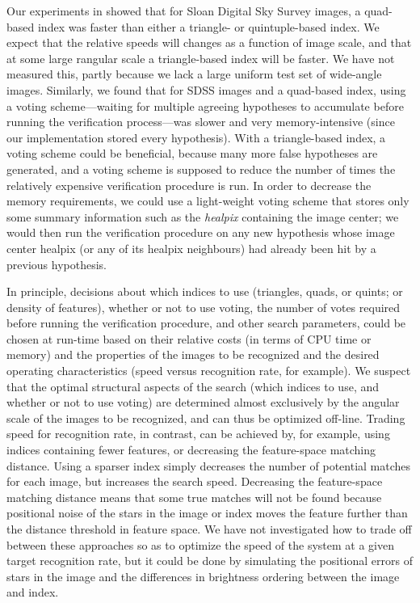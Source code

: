 Our experiments in  showed that for Sloan Digital
Sky Survey images, a quad-based index was faster than either a
triangle- or quintuple-based index.  We expect that the relative
speeds will changes as a function of image scale, and that at some
large rangular scale a triangle-based index will be faster.  We have
not measured this, partly because we lack a large uniform test set of
wide-angle images.  Similarly, we found that for SDSS images and a
quad-based index, using a voting scheme---waiting for multiple
agreeing hypotheses to accumulate before running the verification
process---was slower and very memory-intensive (since our
implementation stored every hypothesis).  With a triangle-based index,
a voting scheme could be beneficial, because many more false
hypotheses are generated, and a voting scheme is supposed to reduce
the number of times the relatively expensive verification procedure is
run.  In order to decrease the memory requirements, we could use a
light-weight voting scheme that stores only some summary information
such as the \emph{healpix} containing the image center; we would then
run the verification procedure on any new hypothesis whose image
center healpix (or any of its healpix neighbours) had already been hit
by a previous hypothesis.


In principle, decisions about which indices to use (triangles, quads,
or quints; or density of features), whether or not to use voting, the
number of votes required before running the verification procedure,
and other search parameters, could be chosen at run-time based on
their relative costs (in terms of CPU time or memory) and the
properties of the images to be recognized and the desired operating
characteristics (speed versus recognition rate, for example).  We
suspect that the optimal structural aspects of the search (which
indices to use, and whether or not to use voting) are determined
almost exclusively by the angular scale of the images to be
recognized, and can thus be optimized off-line.  Trading speed for
recognition rate, in contrast, can be achieved by, for example, using
indices containing fewer features, or decreasing the feature-space
matching distance.  Using a sparser index simply decreases the number
of potential matches for each image, but increases the search speed.
Decreasing the feature-space matching distance means that some true
matches will not be found because positional noise of the stars in the
image or index moves the feature further than the distance threshold
in feature space.  We have not investigated how to trade off between
these approaches so as to optimize the speed of the system at a given
target recognition rate, but it could be done by simulating the
positional errors of stars in the image and the differences in
brightness ordering between the image and index.


